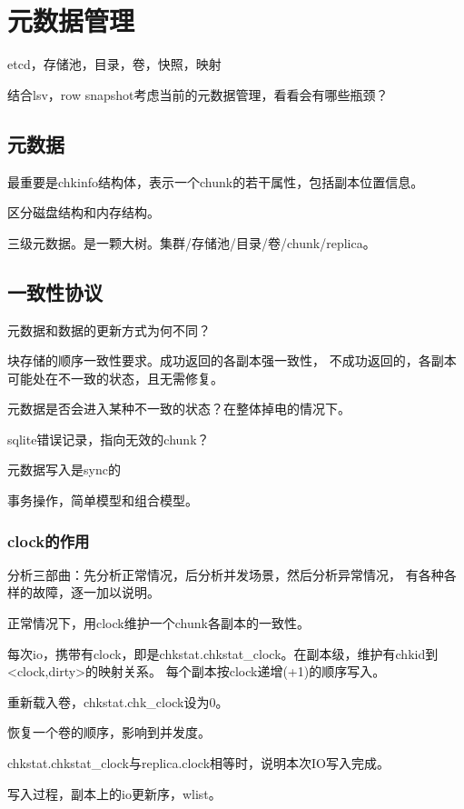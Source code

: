 \chapter{元数据管理}

etcd，存储池，目录，卷，快照，映射

结合lsv，row snapshot考虑当前的元数据管理，看看会有哪些瓶颈？

\section{元数据}

最重要是chkinfo结构体，表示一个chunk的若干属性，包括副本位置信息。

区分磁盘结构和内存结构。

三级元数据。是一颗大树。集群/存储池/目录/卷/chunk/replica。

\section{一致性协议}

元数据和数据的更新方式为何不同？

块存储的顺序一致性要求。成功返回的各副本强一致性，
不成功返回的，各副本可能处在不一致的状态，且无需修复。

元数据是否会进入某种不一致的状态？在整体掉电的情况下。

sqlite错误记录，指向无效的chunk？

元数据写入是sync的

事务操作，简单模型和组合模型。

\subsection{clock的作用}

分析三部曲：先分析正常情况，后分析并发场景，然后分析异常情况，
有各种各样的故障，逐一加以说明。

正常情况下，用clock维护一个chunk各副本的一致性。

每次io，携带有clock，即是chkstat.chkstat\_clock。在副本级，维护有chkid到<clock,dirty>的映射关系。
每个副本按clock递增(+1)的顺序写入。

重新载入卷，chkstat.chk\_clock设为0。

恢复一个卷的顺序，影响到并发度。

chkstat.chkstat\_clock与replica.clock相等时，说明本次IO写入完成。

写入过程，副本上的io更新序，wlist。


